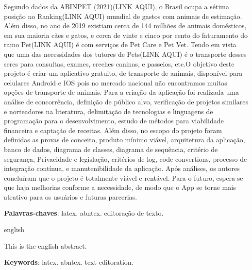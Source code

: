
\setlength{\absparsep}{18pt} %
\begin{resumo}
    
    Segundo dados da ABINPET (2021)(LINK AQUI), o Brasil ocupa a sétima posição no Ranking(LINK AQUI) mundial de gastos com animais de estimação. Além disso, no ano de 2019 existiam cerca de 144 milhões de animais domésticos, em sua maioria cães e gatos, e cerca de vinte e cinco por cento do faturamento do ramo Pet(LINK AQUI) é com serviços de Pet Care e Pet Vet.  Tendo em vista que uma das necessidades dos tutores de Pets(LINK AQUI) é o transporte desses seres para consultas, exames, creches caninas, e passeios, etc.O objetivo deste projeto é criar um aplicativo gratuito, de transporte de animais, disponível para celulares Android e IOS pois no mercado nacional não encontramos muitas opções de transporte de animais. Para a criação da aplicação foi realizada uma análise de concorrência, definição de público alvo, verificação de projetos similares e norteadores na literatura, delimitação de tecnologias e linguagens de programação para o desenvolvimento,  estudo de métodos para viabilidade financeira e   captação de receitas. Além disso, no escopo do projeto foram definidas as provas de conceito, produto  mínimo viável, arquitetura da aplicação, banco de dados,   diagrama de classes, diagrama de sequência, critério de segurança, Privacidade e legislação, critérios de log, code convertions, processo de integração contínua, e manutenibilidade da aplicação. Após análises, os autores concluíram que o projeto é totalmente viável e rentável. Para o futuro, espera-se que haja melhorias conforme a necessidade, de modo que o App se torne mais atrativo para os usuários e futuras parcerias.

 \textbf{Palavras-chaves}: latex. abntex. editoração de texto.
\end{resumo}

\begin{resumo}[Abstract]
 \begin{otherlanguage*}{english}

   This is the english abstract.

   \vspace{\onelineskip}

   \noindent 
   \textbf{Keywords}: latex. abntex. text editoration.
 \end{otherlanguage*}
\end{resumo}